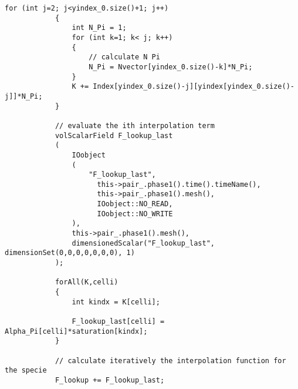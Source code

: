\documentclass[a4paper, 12 pt, fleqn]{article}
\begin{document}
\begin{lstlisting}[gobble=7]
            for (int j=2; j<yindex_0.size()+1; j++)
            {
                int N_Pi = 1;
                for (int k=1; k< j; k++)
                { 
                    // calculate N Pi     
                    N_Pi = Nvector[yindex_0.size()-k]*N_Pi;
                } 
                K += Index[yindex_0.size()-j][yindex[yindex_0.size()-j]]*N_Pi;
            }
 
            // evaluate the ith interpolation term            
            volScalarField F_lookup_last 
            (
                IOobject
                (
                    "F_lookup_last",
	                  this->pair_.phase1().time().timeName(),
	                  this->pair_.phase1().mesh(),
	                  IOobject::NO_READ,
	                  IOobject::NO_WRITE
                ),
                this->pair_.phase1().mesh(),
                dimensionedScalar("F_lookup_last", dimensionSet(0,0,0,0,0,0,0), 1)
            );
            
            forAll(K,celli)
            { 
                int kindx = K[celli];
 
                F_lookup_last[celli] = Alpha_Pi[celli]*saturation[kindx];
            }

            // calculate iteratively the interpolation function for the specie               
            F_lookup += F_lookup_last;  
\end{lstlisting}          
 
\end{document}
